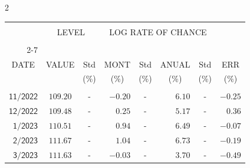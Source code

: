 \begin{multicols}{2}{ 
\begin{tabular}{rccrcrcr} 
\hline 
 \multicolumn{1}{|c|}{}  &  \multicolumn{2}{c|}{} & 
\multicolumn{4}{c}{} & \multicolumn{1}{|c|}{}\vspace{-.10in}\\ 
\multicolumn{1}{|c|}{}  &  \multicolumn{2}{c|}{LEVEL} & 
\multicolumn{4}{c}{LOG RATE OF CHANCE} & \multicolumn{1}{|c|}{}    \\  
\multicolumn{1}{|c|}{}  &  \multicolumn{2}{c|}{} & 
\multicolumn{4}{c}{} & \multicolumn{1}{|c|}{}\vspace{-.10in}\\ \cline{2-7} 
\multicolumn{1}{|c|}{ } &\multicolumn{1}{c|}{ } & \multicolumn{1}{c|}{} & \multicolumn{1}{c|}{} & \multicolumn{1}{c|}{}     & \multicolumn{1}{c|}{} & \multicolumn{1}{c|}{}  & \multicolumn{1}{c|}{}  \vspace{-.05in}\\  
\multicolumn{1}{|c|}{DATE } &\multicolumn{1}{c|}{ VALUE} & \multicolumn{1}{c|}{Std} & \multicolumn{1}{c|}{MONT} & \multicolumn{1}{c|}{Std}     & \multicolumn{1}{c|}{ANUAL} & \multicolumn{1}{c|}{Std}  & \multicolumn{1}{c|}{ERR}\\  
\multicolumn{1}{|c|}{ }      & \multicolumn{1}{c|}{  }    & \multicolumn{1}{c|}{($\%$)}&  \multicolumn{1}{c|}{($\%$)  }  & \multicolumn{1}{c|}{($\%$)} & \multicolumn{1}{c|}{($\%$) }     & \multicolumn{1}{c|}{ ($\%$) }  &  \multicolumn{1}{c|}{ ($\%$) } \\  
 \hline 
 \\$\mathsf{      11/2022}$ &$\mathsf{   109.20}$ &     - &$\mathsf{   -0.20}$ &     - &$\mathsf{     6.10 }$ &     - &$\mathsf{  -0.25} $ \vspace{-.005in}\\ 
$\mathsf{      12/2022}$ &$\mathsf{   109.48}$ &     - &$\mathsf{    0.25}$ &     - &$\mathsf{     5.17 }$ &     - &$\mathsf{   0.36} $ \vspace{-.005in}\\ 
$\mathsf{       1/2023}$ &$\mathsf{   110.51}$ &     - &$\mathsf{    0.94}$ &     - &$\mathsf{     6.49 }$ &     - &$\mathsf{  -0.07} $ \vspace{-.005in}\\ 
$\mathsf{       2/2023}$ &$\mathsf{   111.67}$ &     - &$\mathsf{    1.04}$ &     - &$\mathsf{     6.73 }$ &     - &$\mathsf{  -0.19} $ \vspace{-.005in}\\ 
$\mathsf{       3/2023}$ &$\mathsf{   111.63}$ &     - &$\mathsf{   -0.03}$ &     - &$\mathsf{     3.70 }$ &     - &$\mathsf{  -0.49} $ \vspace{-.005in}\\ 

\end{tabular}}
\end{multicols}
